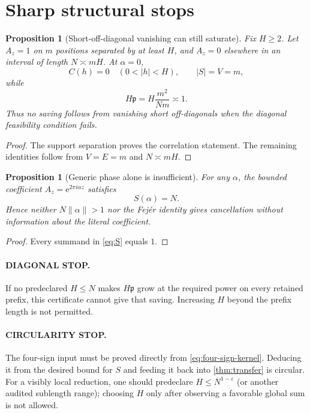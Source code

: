 \documentclass[11pt]{article}
\newtheorem{proposition}[theorem]{Proposition}
\theoremstyle{definition}
\theoremstyle{remark}
\newcommand{\e}{\mathrm e}
\begin{document}
\section{Sharp structural stops}

\begin{proposition}[Short-off-diagonal vanishing can still saturate]
\label{prop:sparse}
Fix \(H\ge2\).  Let \(A_z=1\) on \(m\) positions separated by at
least \(H\), and \(A_z=0\) elsewhere in an interval of length
\(N\asymp mH\).  At \(\alpha=0\),
\[
 C(h)=0\quad(0<|h|<H),\qquad
 |S|=V=m,
\]
while
\[
 H\mathfrak p
 =H\frac{m^2}{Nm}\asymp1.
\]
Thus no saving follows from vanishing short off-diagonals when the
diagonal feasibility condition fails.
\end{proposition}

\begin{proof}
The support separation proves the correlation statement.  The
remaining identities follow from \(V=E=m\) and \(N\asymp mH\).
\end{proof}

\begin{proposition}[Generic phase alone is insufficient]
\label{prop:phase-match}
For any \(\alpha\), the bounded coefficient
\(A_z=\e^{2\pi i\alpha z}\) satisfies
\[
 S(\alpha)=N.
\]
Hence neither \(N\|\alpha\|>1\) nor the Fej\'er identity gives
cancellation without information about the literal coefficient.
\end{proposition}

\begin{proof}
Every summand in \eqref{eq:S} equals \(1\).
\end{proof}

\paragraph{DIAGONAL STOP.}
If no predeclared \(H\le N\) makes
\(H\mathfrak p\) grow at the required power on every retained
prefix, this certificate cannot give that saving.  Increasing \(H\)
beyond the prefix length is not permitted.

\paragraph{CIRCULARITY STOP.}
The four-sign input must be proved directly from
\eqref{eq:four-sign-kernel}.  Deducing it from the desired bound for
\(S\) and feeding it back into \cref{thm:transfer} is circular.
For a visibly local reduction, one should predeclare
\(H\le N^{1-\varepsilon}\) (or another audited sublength range);
choosing \(H\) only after observing a favorable global sum is not
allowed.
\end{document}
